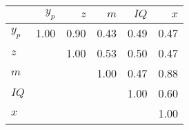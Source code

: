\begin{tabular}{lrrrrr}
\hline
 & $y_{p}$  & $z$  & $m$  & $IQ$  & $x$  \\ 
\hline
$y_{p}$ & 1.00  & 0.90  & 0.43  & 0.49  & 0.47  \\ 
$z$ &   & 1.00  & 0.53  & 0.50  & 0.47  \\ 
$m$ &   &   & 1.00  & 0.47  & 0.88  \\ 
$IQ$ &   &   &   & 1.00  & 0.60  \\ 
$x$ &   &   &   &   & 1.00  \\ 
\hline
\end{tabular}%
